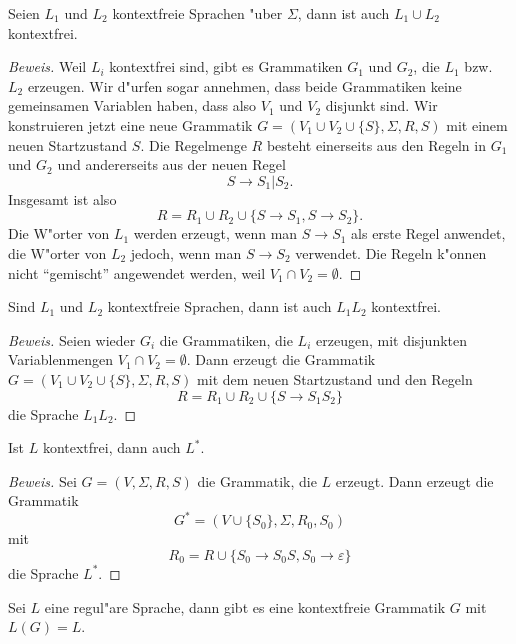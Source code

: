 \begin{satz}[Vereinigung]
Seien $L_1$ und $L_2$ kontextfreie Sprachen "uber $\Sigma$,
dann ist auch $L_1\cup L_2$ kontextfrei.
\end{satz}

\begin{proof}[Beweis]
Weil $L_i$ kontextfrei sind,  gibt es Grammatiken $G_1$ und $G_2$,
die $L_1$ bzw.~$L_2$ erzeugen. Wir d"urfen sogar annehmen, dass
beide Grammatiken keine
gemeinsamen Variablen haben, dass also $V_1$ und $V_2$ 
disjunkt sind. Wir konstruieren jetzt eine neue Grammatik
$G=(V_1\cup V_2\cup\{S\}, \Sigma, R, S)$ mit einem neuen
Startzustand $S$. Die Regelmenge $R$ besteht einerseits aus
den Regeln in $G_1$ und $G_2$ und andererseits aus der neuen
Regel
\[
S\to S_1 | S_2.
\]
Insgesamt ist also
\[
R=R_1\cup R_2\cup \{S\to S_1, S\to S_2\}.
\]
Die W"orter von $L_1$ werden erzeugt, wenn man $S\to S_1$ als
erste Regel anwendet, die W"orter von $L_2$ jedoch, wenn 
man $S\to S_2$ verwendet. Die Regeln k"onnen nicht ``gemischt''
angewendet werden, weil $V_1\cap V_2=\emptyset$.
\end{proof}

\begin{satz}[Verkettung]
Sind $L_1$ und $L_2$ kontextfreie Sprachen, dann ist auch $L_1L_2$
kontextfrei.
\end{satz}

\begin{proof}[Beweis]
Seien wieder $G_i$ die Grammatiken, die $L_i$ erzeugen, mit disjunkten
Variablenmengen $V_1\cap V_2=\emptyset$. Dann erzeugt die Grammatik
$G=(V_1\cup V_2\cup\{S\},\Sigma, R,S)$ mit dem neuen Startzustand
und den Regeln
\[
R=R_1\cup R_2\cup \{S\to S_1S_2\}
\]
die Sprache $L_1L_2$.
\end{proof}

\begin{satz}[$*$-Operation]
Ist $L$ kontextfrei, dann auch $L^*$.
\end{satz}

\begin{proof}[Beweis]
Sei $G=(V,\Sigma,R,S)$ die Grammatik, die $L$ erzeugt. Dann erzeugt die
Grammatik
\[
G^*=(V\cup \{S_0\}, \Sigma, R_0, S_0)
\]
mit
\[
R_0=R\cup \{ S_0\to S_0S, S_0\to\varepsilon \}
\]
die Sprache $L^*$.
\end{proof}

\begin{satz} Sei $L$ eine regul"are Sprache, dann gibt es eine
kontextfreie Grammatik $G$ mit $L(G)=L$.
\end{satz}


